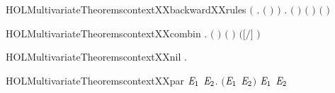 \begin{SaveVerbatim}{HOLMultivariateTheoremscontextXXbackwardXXrules}
   \ensuremath{(}\HOLSymConst{\HOLTokenForall{}}  .   \ensuremath{(}  \ensuremath{)} \HOLSymConst{\HOLTokenImp{}}   \ensuremath{)} \HOLSymConst{\HOLTokenConj{}}
   \HOLSymConst{\HOLTokenForall{}}  .
         \ensuremath{(}  \ensuremath{)} \HOLSymConst{\HOLTokenImp{}}  \ensuremath{(}   \ensuremath{)} \ensuremath{(} \ensuremath{)}
\end{SaveVerbatim}
\newcommand{\HOLMultivariateTheoremscontextXXbackwardXXrules}{\UseVerbatim{HOLMultivariateTheoremscontextXXbackwardXXrules}}
\begin{SaveVerbatim}{HOLMultivariateTheoremscontextXXcombin}
\HOLTokenTurnstile{} \HOLSymConst{\HOLTokenForall{}}  .
         \HOLSymConst{\HOLTokenConj{}}    \HOLSymConst{\HOLTokenConj{}}  \ensuremath{(} \ensuremath{)}  \HOLSymConst{\HOLTokenConj{}}
       \ensuremath{(}  \HOLSymConst{\ensuremath{=}}  \ensuremath{)} \HOLSymConst{\HOLTokenImp{}}
         \ensuremath{(}\ensuremath{[}\ensuremath{/}\ensuremath{]} \ensuremath{)}
\end{SaveVerbatim}
\newcommand{\HOLMultivariateTheoremscontextXXcombin}{\UseVerbatim{HOLMultivariateTheoremscontextXXcombin}}
\begin{SaveVerbatim}{HOLMultivariateTheoremscontextXXnil}
\HOLTokenTurnstile{} \HOLSymConst{\HOLTokenForall{}}.   
\end{SaveVerbatim}
\newcommand{\HOLMultivariateTheoremscontextXXnil}{\UseVerbatim{HOLMultivariateTheoremscontextXXnil}}
\begin{SaveVerbatim}{HOLMultivariateTheoremscontextXXpar}
\HOLTokenTurnstile{} \HOLSymConst{\HOLTokenForall{}} \ensuremath{\HOLBoundVar{E}\sb{\mathrm{1}}} \ensuremath{\HOLBoundVar{E}\sb{\mathrm{2}}}.
         \ensuremath{(}\ensuremath{\HOLBoundVar{E}\sb{\mathrm{1}}} \HOLSymConst{\ensuremath{\mid}} \ensuremath{\HOLBoundVar{E}\sb{\mathrm{2}}}\ensuremath{)} \HOLSymConst{\HOLTokenImp{}}   \ensuremath{\HOLBoundVar{E}\sb{\mathrm{1}}} \HOLSymConst{\HOLTokenConj{}}   \ensuremath{\HOLBoundVar{E}\sb{\mathrm{2}}}
\end{SaveVerbatim}
